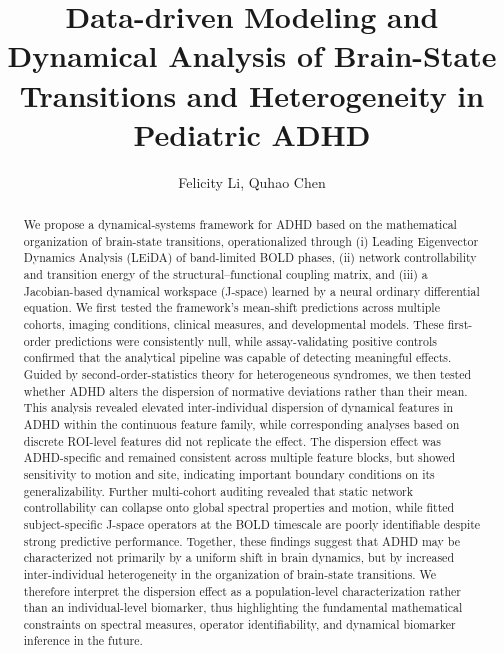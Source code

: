 \documentclass{article}
\begin{document}
\title{Data-driven Modeling and Dynamical Analysis of Brain-State Transitions and Heterogeneity in Pediatric ADHD}
\author{Felicity Li, Quhao Chen}


\maketitle

\begin{abstract}
We propose a dynamical-systems framework for ADHD based on the mathematical organization of brain-state transitions, operationalized through (i) Leading Eigenvector Dynamics Analysis (LEiDA) of band-limited BOLD phases, (ii) network controllability and transition energy of the structural--functional coupling matrix, and (iii) a Jacobian-based dynamical workspace (J-space) learned by a neural ordinary differential equation. We first tested the framework's mean-shift predictions across multiple cohorts, imaging conditions, clinical measures, and developmental models. These first-order predictions were consistently null, while assay-validating positive controls confirmed that the analytical pipeline was capable of detecting meaningful effects. Guided by second-order-statistics theory for heterogeneous syndromes, we then tested whether ADHD alters the dispersion of normative deviations rather than their mean. This analysis revealed elevated inter-individual dispersion of dynamical features in ADHD within the continuous feature family, while corresponding analyses based on discrete ROI-level features did not replicate the effect. The dispersion effect was ADHD-specific and remained consistent across multiple feature blocks, but showed sensitivity to motion and site, indicating important boundary conditions on its generalizability. Further multi-cohort auditing revealed that static network controllability can collapse onto global spectral properties and motion, while fitted subject-specific J-space operators at the BOLD timescale are poorly identifiable despite strong predictive performance. Together, these findings suggest that ADHD may be characterized not primarily by a uniform shift in brain dynamics, but by increased inter-individual heterogeneity in the organization of brain-state transitions. We therefore interpret the dispersion effect as a population-level characterization rather than an individual-level biomarker, thus highlighting the fundamental mathematical constraints on spectral measures, operator identifiability, and dynamical biomarker inference in the future.

\end{abstract}
\end{document}
